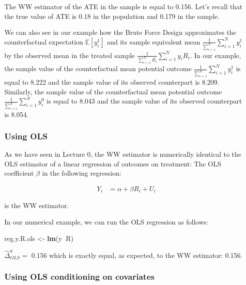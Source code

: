 \documentclass[]{book}
\newenvironment{Shaded}{\begin{snugshade}}{\end{snugshade}}
\newcommand{\KeywordTok}[1]{\textcolor[rgb]{0.13,0.29,0.53}{\textbf{#1}}}
\newcommand{\StringTok}[1]{\textcolor[rgb]{0.31,0.60,0.02}{#1}}
\newcommand{\OperatorTok}[1]{\textcolor[rgb]{0.81,0.36,0.00}{\textbf{#1}}}
\newcommand{\NormalTok}[1]{#1}
\newcommand{\esp}[1]{\mathbb{E}[ #1 ]}
\theoremstyle{definition}
\theoremstyle{definition}
\theoremstyle{definition}
\theoremstyle{remark}
\let\BeginKnitrBlock\begin \let\EndKnitrBlock\end
\begin{document}
The WW estimator of the ATE in the sample is equal to 0.156. Let's
recall that the true value of ATE is 0.18 in the population and 0.179 in
the sample.

We can also see in our example how the Brute Force Design approximates
the counterfactual expectation \(\esp{y_i^1}\) and its sample equivalent
mean \(\frac{1}{\sum_{i=1}^N}\sum_{i=1}^N y^1_i\) by the observed mean
in the treated sample \(\frac{1}{\sum_{i=1}^N R_i}\sum_{i=1}^N y_iR_i\).
In our example, the sample value of the counterfactual mean potential
outcome \(\frac{1}{\sum_{i=1}^N}\sum_{i=1}^N y^1_i\) is equal to 8.222
and the sample value of its observed counterpart is 8.209. Similarly,
the sample value of the counterfactual mean potential outcome
\(\frac{1}{\sum_{i=1}^N}\sum_{i=1}^N y^0_i\) is equal to 8.043 and the
sample value of its observed counterpart is 8.054.

\subsubsection{Using OLS}\label{using-ols}

As we have seen in Lecture 0, the WW estimator is numerically identical
to the OLS estimator of a linear regression of outcomes on treatment:
The OLS coefficient \(\beta\) in the following regression:

\begin{align*}
    Y_i &  = \alpha +  \beta R_i + U_i
    \end{align*}

is the WW estimator.

\BeginKnitrBlock{example}
\protect\hypertarget{exm:unnamed-chunk-71}{}{\label{exm:unnamed-chunk-71}
}In our numerical example, we can run the OLS regression as follows:
\EndKnitrBlock{example}

\begin{Shaded}
\begin{Highlighting}[]
\NormalTok{reg.y.R.ols <-}\StringTok{ }\KeywordTok{lm}\NormalTok{(y}\OperatorTok{~}\NormalTok{R)}
\end{Highlighting}
\end{Shaded}

\(\hat{\Delta}^y_{OLS}=\) 0.156 which is exactly equal, as expected, to
the WW estimator: 0.156.

\subsubsection{Using OLS conditioning on
covariates}\label{using-ols-conditioning-on-covariates}
\end{document}
